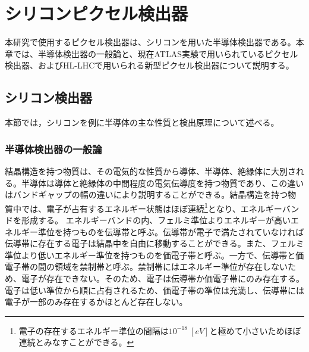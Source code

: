 \chapter{シリコンピクセル検出器}
\label{sec:chap2}
本研究で使用するピクセル検出器は、シリコンを用いた半導体検出器である。本章では、半導体検出器の一般論と、現在ATLAS実験で用いられているピクセル検出器、およびHL-LHCで用いられる新型ピクセル検出器について説明する。

\section{シリコン検出器}
\label{sec:handoutai}

本節では，シリコンを例に半導体の主な性質と検出原理について述べる。

\subsection{半導体検出器の一般論}
\label{sec:handoutai}
結晶構造を持つ物質は、その電気的な性質から導体、半導体、絶縁体に大別される。半導体は導体と絶縁体の中間程度の電気伝導度を持つ物質であり、この違いはバンドギャップの幅の違いにより説明することができる。結晶構造を持つ物質中では、電子が占有するエネルギー状態はほぼ連続\footnote{電子の存在するエネルギー準位の間隔は$10^{-18}\ [\si{eV}]$と極めて小さいためほぼ連続とみなすことができる。}となり、エネルギーバンドを形成する。
エネルギーバンドの内、フェルミ準位よりエネルギーが高いエネルギー準位を持つものを伝導帯と呼ぶ。伝導帯が電子で満たされていなければ伝導帯に存在する電子は結晶中を自由に移動することができる。また、フェルミ準位より低いエネルギー準位を持つものを価電子帯と呼ぶ。一方で、伝導帯と価電子帯の間の領域を禁制帯と呼ぶ。禁制帯にはエネルギー準位が存在しないため、電子が存在できない。そのため、電子は伝導帯か価電子帯にのみ存在する。電子は低い準位から順に占有されるため、価電子帯の準位は充満し、伝導帯には電子が一部のみ存在するかほとんど存在しない。

